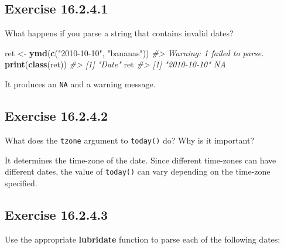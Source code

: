 \documentclass[]{book}
\newenvironment{Shaded}{\begin{snugshade}}{\end{snugshade}}
\newcommand{\CommentTok}[1]{\textcolor[rgb]{0.56,0.35,0.01}{\textit{#1}}}
\newcommand{\KeywordTok}[1]{\textcolor[rgb]{0.13,0.29,0.53}{\textbf{#1}}}
\newcommand{\NormalTok}[1]{#1}
\newcommand{\StringTok}[1]{\textcolor[rgb]{0.31,0.60,0.02}{#1}}
\theoremstyle{plain}
\theoremstyle{remark}
\begin{document}
\hypertarget{exercise-16.2.4.1}{%
\subsection*{\texorpdfstring{Exercise {16.2.4.1}}{Exercise 16.2.4.1}}\label{exercise-16.2.4.1}}

What happens if you parse a string that
contains invalid dates?

\begin{Shaded}
\begin{Highlighting}[]
\NormalTok{ret <-}\StringTok{ }\KeywordTok{ymd}\NormalTok{(}\KeywordTok{c}\NormalTok{(}\StringTok{"2010-10-10"}\NormalTok{, }\StringTok{"bananas"}\NormalTok{))}
\CommentTok{#> Warning: 1 failed to parse.}
\KeywordTok{print}\NormalTok{(}\KeywordTok{class}\NormalTok{(ret))}
\CommentTok{#> [1] "Date"}
\NormalTok{ret}
\CommentTok{#> [1] "2010-10-10" NA}
\end{Highlighting}
\end{Shaded}

It produces an \texttt{NA} and a warning message.

\hypertarget{exercise-16.2.4.2}{%
\subsection*{\texorpdfstring{Exercise {16.2.4.2}}{Exercise 16.2.4.2}}\label{exercise-16.2.4.2}}

What does the \texttt{tzone} argument to \texttt{today()} do? Why is it important?

It determines the time-zone of the date. Since different time-zones can have different dates, the value of \texttt{today()} can vary depending on the time-zone specified.

\hypertarget{exercise-16.2.4.3}{%
\subsection*{\texorpdfstring{Exercise {16.2.4.3}}{Exercise 16.2.4.3}}\label{exercise-16.2.4.3}}

Use the appropriate \textbf{lubridate} function to
parse each of the following dates:
\end{document}
